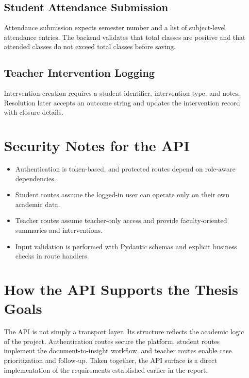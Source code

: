 \subsection{Student Attendance Submission}
Attendance submission expects semester number and a list of subject-level attendance entries. The backend validates that total classes are positive and that attended classes do not exceed total classes before saving.

\subsection{Teacher Intervention Logging}
Intervention creation requires a student identifier, intervention type, and notes. Resolution later accepts an outcome string and updates the intervention record with closure details.

\section{Security Notes for the API}
\begin{itemize}[leftmargin=*]
\item Authentication is token-based, and protected routes depend on role-aware dependencies.
\item Student routes assume the logged-in user can operate only on their own academic data.
\item Teacher routes assume teacher-only access and provide faculty-oriented summaries and interventions.
\item Input validation is performed with Pydantic schemas and explicit business checks in route handlers.
\end{itemize}

\section{How the API Supports the Thesis Goals}
The API is not simply a transport layer. Its structure reflects the academic logic of the project. Authentication routes secure the platform, student routes implement the document-to-insight workflow, and teacher routes enable case prioritization and follow-up. Taken together, the API surface is a direct implementation of the requirements established earlier in the report.
